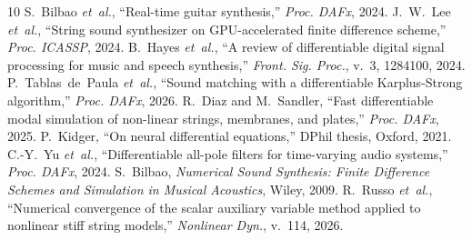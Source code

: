 \documentclass[a4paper]{article}
\begin{document}
\begin{sloppy}
{\footnotesize
\begin{thebibliography}{10}
 S.~Bilbao \emph{et~al.}, ``Real-time guitar synthesis,'' \emph{Proc. DAFx}, 2024.
 J.~W.~Lee \emph{et~al.}, ``String sound synthesizer on GPU-accelerated finite difference scheme,'' \emph{Proc. ICASSP}, 2024.
 B.~Hayes \emph{et~al.}, ``A review of differentiable digital signal processing for music and speech synthesis,'' \emph{Front. Sig. Proc.}, v.~3, 1284100, 2024.
 P.~Tablas~de~Paula \emph{et~al.}, ``Sound matching with a differentiable Karplus-Strong algorithm,'' \emph{Proc. DAFx}, 2026.
 R.~Diaz and M.~Sandler, ``Fast differentiable modal simulation of non-linear strings, membranes, and plates,'' \emph{Proc. DAFx}, 2025.
 P.~Kidger, ``On neural differential equations,'' DPhil thesis, Oxford, 2021.
 C.-Y.~Yu \emph{et~al.}, ``Differentiable all-pole filters for time-varying audio systems,'' \emph{Proc. DAFx}, 2024.
 S.~Bilbao, \emph{Numerical Sound Synthesis: Finite Difference Schemes and Simulation in Musical Acoustics}, Wiley, 2009.
 R.~Russo \emph{et~al.}, ``Numerical convergence of the scalar auxiliary variable method applied to nonlinear stiff string models,'' \emph{Nonlinear Dyn.}, v.~114, 2026.
\end{thebibliography}}
\end{sloppy}
\end{document}

